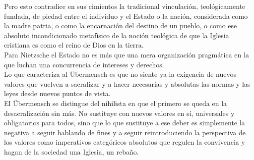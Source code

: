 \documentclass[a4paper, 10pt, twocolumn, spanish]{article}
\begin{document}
Pero esto contradice en sus cimientos la tradicional vinculación,
teológicamente fundada, de piedad entre el individuo y el Estado o la
nación, considerada como la madre patria, o como la encarnación del
destino de un pueblo, o como ese absoluto incondicionado metafísico de
la noción teológica de que la Iglesia cristiana es como el reino de
Dios en la tierra.\\[0pt]

Para Nietzsche el Estado no es más que una mera organización
pragmática en la que luchan una concurrencia de intereses y
derechos.\\[0pt]
Lo que caracteriza al Übermensch es que no siente ya la exigencia de
nuevos valores que vuelven a sacralizar y a hacer necesarias y
absolutas las normas y las leyes desde nuevos puntos de vista.\\[0pt]
El Übermensch se distingue del nihilista en que el primero se queda en
la desacralización sin más. No sustituye con nuevos valores en sí,
universales y obligatorios para todos, sino que lo que sustituye a ese
deber es simplemente la negativa a seguir hablando de fines y a seguir
reintroduciendo la perspectiva de los valores como imperativos
categóricos absolutos que regulen la convivencia y hagan de la
sociedad una Iglesia, un rebaño.
\end{document}
